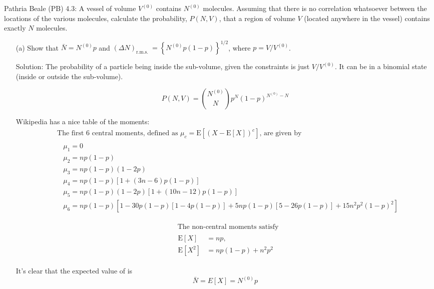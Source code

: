 \newpage
\begin{homeworkProblem}
    Pathria Beale (PB) 4.3: A vessel of volume $V^{(0)}$ contains $N^{(0)}$ molecules. Assuming that there is no correlation whatsoever between the locations of the various molecules, calculate the probability, $P(N, V)$, that a region of volume $V$ (located anywhere in the vessel) contains exactly $N$ molecules.
    \begin{itemize}
        \item[(a)] Show that $\bar{N}=N^{(0)} p$ and $(\Delta N)_{\text {r.m.s. }}=\left\{N^{(0)} p(1-p)\right\}^{1 / 2}$, where $p=V / V^{(0)}$.
            \begin{callout}{Solution:}
                The probability of a particle being inside the sub-volume, given the constraints is just $V /V^{(0)}$. It can be in a binomial state (inside or outside the sub-volume).

                $$P(N,V) = \binom{N^{(0)}}{N} p^N(1-p)^{N^{(0)}-N} $$

                Wikipedia has a nice table of the moments:
                $$ \begin{aligned}
&\text { The first } 6 \text { central moments, defined as } \mu_c=\mathrm{E}\left[(X-\mathrm{E}[X])^c\right] \text {, are given by }\\
&\begin{aligned}
& \mu_1=0 \\
& \mu_2=n p(1-p) \\
& \mu_3=n p(1-p)(1-2 p) \\
& \mu_4=n p(1-p)[1+(3 n-6) p(1-p)] \\
& \mu_5=n p(1-p)(1-2 p)[1+(10 n-12) p(1-p)] \\
& \mu_6=n p(1-p)\left[1-30 p(1-p)[1-4 p(1-p)]+5 n p(1-p)[5-26 p(1-p)]+15 n^2 p^2(1-p)^2\right]
\end{aligned}
                \end{aligned}
                $$

                $$
                \begin{aligned}
&\text { The non-central moments satisfy }\\
&\begin{aligned}
    \mathrm{E}[X] & =n p, \\
    \mathrm{E}\left[X^2\right] & =n p(1-p)+n^2 p^2
\end{aligned}
                \end{aligned}
                $$

                It's clear that the expected value of is 
                $$\bar{N} = E[X] = N^{(0)}p$$


\end{callout}
\end{itemize}
\end{homeworkProblem}
